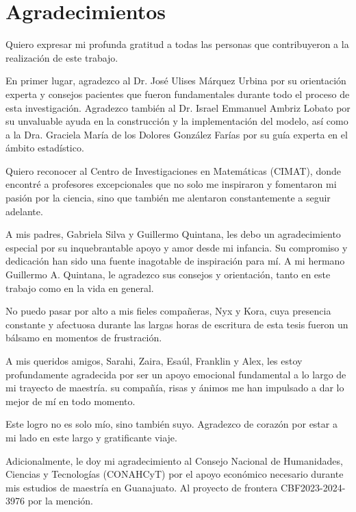 \chapter*{Agradecimientos}

Quiero expresar mi profunda gratitud a todas las personas que contribuyeron a la realización de este trabajo.

En primer lugar, agradezco al Dr. José Ulises Márquez Urbina por su orientación experta y consejos pacientes que fueron fundamentales durante todo el proceso de esta investigación. Agradezco también al Dr. Israel Emmanuel Ambriz Lobato por su unvaluable ayuda en la construcción y la implementación del modelo, así como a la Dra. Graciela María de los Dolores González Farías por su guía experta en el ámbito estadístico.

Quiero reconocer al Centro de Investigaciones en Matemáticas (CIMAT), donde encontré a profesores excepcionales que no solo me inspiraron y fomentaron mi pasión por la ciencia, sino que también me alentaron constantemente a seguir adelante.

A mis padres, Gabriela Silva y Guillermo Quintana, les debo un agradecimiento especial por su inquebrantable apoyo y amor desde mi infancia. Su compromiso y dedicación han sido una fuente inagotable de inspiración para mí. A mi hermano Guillermo A. Quintana, le agradezco sus consejos y orientación, tanto en este trabajo como en la vida en general.

No puedo pasar por alto a mis fieles compañeras, Nyx y Kora, cuya presencia constante y afectuosa durante las largas horas de escritura de esta tesis fueron un bálsamo en momentos de frustración.

A mis queridos amigos, Sarahi, Zaira, Esaúl, Franklin y Alex, les estoy profundamente agradecida por ser un apoyo emocional fundamental a lo largo de mi trayecto de maestría. su compañía, risas y ánimos me han impulsado a dar lo mejor de mí en todo momento.

Este logro no es solo mío, sino también suyo. Agradezco de corazón por estar a mi lado en este largo y gratificante viaje.

Adicionalmente, le doy mi agradecimiento al Consejo Nacional de Humanidades, Ciencias y Tecnologías (CONAHCyT) por el apoyo económico necesario durante mis estudios de maestría en Guanajuato. Al proyecto de frontera CBF2023-2024-3976 por la mención.
